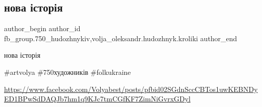  
 
 
 
 

\subsection{нова історія}
\label{sec:12_03_2018.fb.fb_group.750_hudozhnykiv.1.nova_istoria}
 
\ifcmt
 author_begin
   author_id fb_group.750_hudozhnykiv,volja_oleksandr.hudozhnyk.kroliki
 author_end
\fi

нова історія🐇

\#artvolya \#750художників \#folkukraine

\url{https://www.facebook.com/Volyabest/posts/pfbid02SGdnSccCBTos1uwKEBNDyED1BPwSdDAQJb7hm1q9KJc7tmCGfKF7ZimNiGvrxGDyl}

